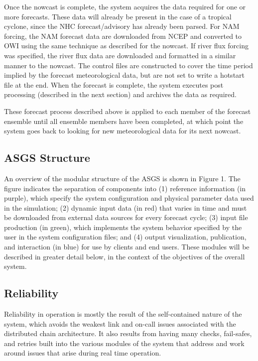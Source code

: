 \documentclass[12pt]{article}
\begin{document}
Once the nowcast is complete, the system acquires the data required 
for one or more forecasts. These data will already be present in the 
case of a tropical cyclone, since the NHC forecast/advisory has 
already been parsed. For NAM forcing, the NAM forecast data are 
downloaded from NCEP and converted to OWI using the same technique 
as described for the nowcast. If river flux forcing was specified, 
the river flux data are downloaded and formatted in a similar manner 
to the nowcast. The control files are constructed to cover the time 
period implied by the forecast meteorological data, but are not set 
to write a hotstart file at the end. When the forecast is complete, 
the system executes post processing (described in the next section) 
and archives the data as required. 

These forecast process described above is applied to  each member of 
the forecast ensemble until all ensemble members have been 
completed, at which point the system goes back to looking for new 
meteorological data for its next nowcast.


\subsection{ASGS Structure}

An overview of the modular structure of the ASGS is shown in Figure 
1. The figure indicates the separation of components into (1) 
reference information (in purple), which specify the system 
configuration and physical parameter data used in the simulation; 
(2) dynamic input data (in red) that varies in time and must be 
downloaded from external data sources for every forecast cycle; (3) 
input file production (in green), which implements the system 
behavior specified by the user in the system configuration files; 
and (4) output visualization, publication, and interaction (in blue) 
for use by clients and end users. These modules will be described in 
greater detail below, in the context of the objectives of the
overall system. 

\subsection{Reliability}

Reliability in operation is mostly the result of the self-contained 
nature of the system, which avoids the weakest link and on-call 
issues associated with the distributed chain architecture. It also 
results from having many checks, fail-safes, and retries built into 
the various modules of the system that address and work around issues
that arise during real time operation. 
\end{document}
